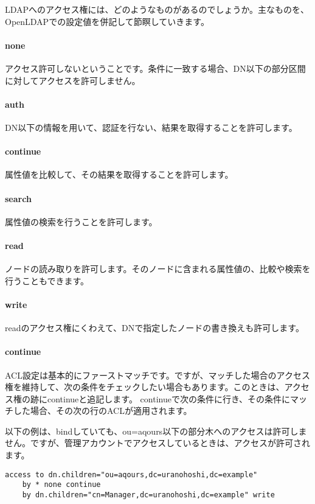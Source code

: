LDAPへのアクセス権には、どのようなものがあるのでしょうか。主なものを、OpenLDAPでの設定値を併記して節瞑していきます。

\paragraph{none}
アクセス許可しないということです。条件に一致する場合、DN以下の部分区間に対してアクセスを許可しません。

\paragraph{auth}
DN以下の情報を用いて、認証を行ない、結果を取得することを許可します。

\paragraph{continue}
属性値を比較して、その結果を取得することを許可します。

\paragraph{search}
属性値の検索を行うことを許可します。

\paragraph{read}
ノードの読み取りを許可します。そのノードに含まれる属性値の、比較や検索を行うこともできます。

\paragraph{write}
readのアクセス権にくわえて、DNで指定したノードの書き換えも許可します。

\paragraph{continue}
ACL設定は基本的にファーストマッチです。ですが、マッチした場合のアクセス権を維持して、次の条件をチェックしたい場合もあります。このときは、アクセス権の跡にcontinueと追記します。
continueで次の条件に行き、その条件にマッチした場合、その次の行のACLが適用されます。

以下の例は、bindしていても、ou=aqours以下の部分木へのアクセスは許可しません。ですが、管理アカウントでアクセスしているときは、アクセスが許可されます。

\begin{verbatim}
access to dn.children="ou=aqours,dc=uranohoshi,dc=example"
    by * none continue
    by dn.children="cn=Manager,dc=uranohoshi,dc=example" write

\end{verbatim}